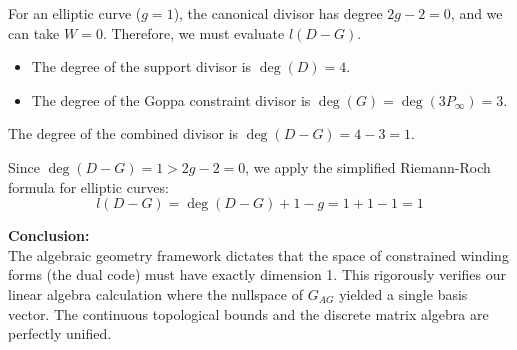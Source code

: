 \documentclass[11pt]{article}
\begin{document}
\begin{mdframed}[backgroundcolor=gray!5, linecolor=gray!50, linewidth=1pt]
			For an elliptic curve ($g=1$), the canonical divisor has degree $2g - 2 = 0$, and we can take $W = 0$. Therefore, we must evaluate $l(D - G)$.
			\begin{itemize}
				\item The degree of the support divisor is $\deg(D) = 4$.
				\item The degree of the Goppa constraint divisor is $\deg(G) = \deg(3P_\infty) = 3$.
			\end{itemize}
			The degree of the combined divisor is $\deg(D - G) = 4 - 3 = 1$. 
			
			Since $\deg(D - G) = 1 > 2g - 2 = 0$, we apply the simplified Riemann-Roch formula for elliptic curves:
			$$ l(D - G) = \deg(D - G) + 1 - g = 1 + 1 - 1 = 1 $$
			
			\vspace{0.3cm}
			\textbf{Conclusion:} \\
			The algebraic geometry framework dictates that the space of constrained winding forms (the dual code) must have exactly dimension 1. This rigorously verifies our linear algebra calculation where the nullspace of $G_{AG}$ yielded a single basis vector. The continuous topological bounds and the discrete matrix algebra are perfectly unified.
		\end{mdframed}
	
\end{document}
